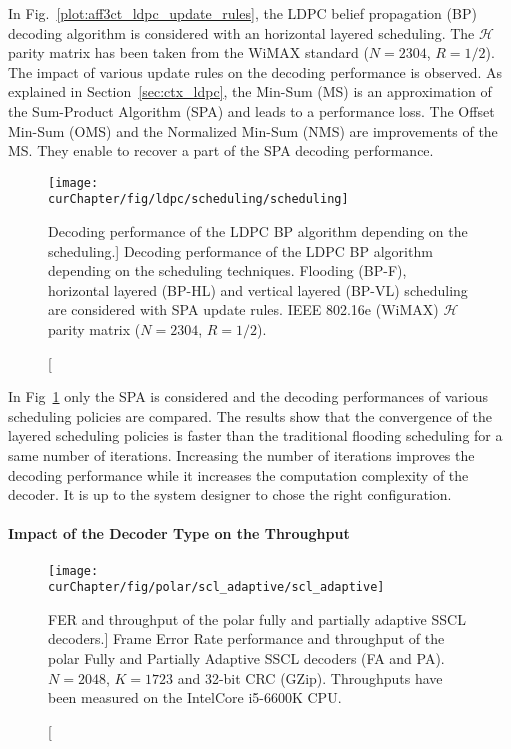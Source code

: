 In Fig.~\ref{plot:aff3ct_ldpc_update_rules}, the LDPC belief propagation (BP)
decoding algorithm is considered with an horizontal layered scheduling. The
$\mathcal{H}$ parity matrix has been taken from the WiMAX standard ($N=2304$,
$R=1/2$). The impact of various update rules on the decoding performance is
observed. As explained in Section~\ref{sec:ctx_ldpc}, the Min-Sum (MS) is an
approximation of the Sum-Product Algorithm (SPA) and leads to a performance
loss. The Offset Min-Sum (OMS) and the Normalized Min-Sum (NMS) are improvements
of the MS. They enable to recover a part of the SPA decoding performance.

\begin{figure}[htp]
  \centering
  \texttt{[image: \\curChapter/fig/ldpc/scheduling/scheduling]}
  \caption
    [Decoding performance of the LDPC BP algorithm depending on the scheduling.]
    {Decoding performance of the LDPC BP algorithm depending on the scheduling
     techniques. Flooding (BP-F), horizontal layered (BP-HL) and vertical
     layered (BP-VL) scheduling are considered with SPA update rules. IEEE
     802.16e (WiMAX) $\mathcal{H}$ parity matrix ($N=2304$, $R=1/2$).}
  \label{plot:aff3ct_ldpc_scheduling}
\end{figure}

In Fig~\ref{plot:aff3ct_ldpc_scheduling} only the SPA is considered
and the decoding performances of various scheduling policies are compared. The
results show that the convergence of the layered scheduling policies is faster
than the traditional flooding scheduling for a same number of iterations.
Increasing the number of iterations improves the decoding performance while it
increases the computation complexity of the decoder. It is up to the system
designer to chose the right configuration.

\paragraph{Impact of the Decoder Type on the Throughput}

\begin{figure}[htp]
  \centering
  \texttt{[image: \\curChapter/fig/polar/scl\_adaptive/scl\_adaptive]}
  \caption
    [FER and throughput of the polar fully and partially adaptive SSCL
     decoders.]
    {Frame Error Rate performance and throughput of the polar Fully and
     Partially Adaptive SSCL decoders (FA and PA). $N = 2048$, $K = 1723$ and
     32-bit CRC (GZip). Throughputs have been measured on the Intel\R Core\TM
     i5-6600K CPU.}
  \label{plot:aff3ct_polar_scl_adaptive}
\end{figure}

